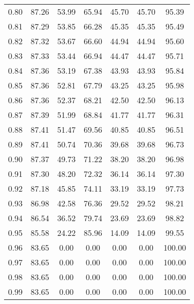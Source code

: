 \begin{tabular}{|c|c|c|c|c|c|c|}
      0.80 &     87.26 &     53.99 &      65.94 &   45.70 &      45.70 &         95.39 \\
      0.81 &     87.29 &     53.85 &      66.28 &   45.35 &      45.35 &         95.49 \\
      0.82 &     87.32 &     53.67 &      66.60 &   44.94 &      44.94 &         95.60 \\
      0.83 &     87.33 &     53.44 &      66.94 &   44.47 &      44.47 &         95.71 \\
      0.84 &     87.36 &     53.19 &      67.38 &   43.93 &      43.93 &         95.84 \\
      0.85 &     87.36 &     52.81 &      67.79 &   43.25 &      43.25 &         95.98 \\
      0.86 &     87.36 &     52.37 &      68.21 &   42.50 &      42.50 &         96.13 \\
      0.87 &     87.39 &     51.99 &      68.84 &   41.77 &      41.77 &         96.31 \\
      0.88 &     87.41 &     51.47 &      69.56 &   40.85 &      40.85 &         96.51 \\
      0.89 &     87.41 &     50.74 &      70.36 &   39.68 &      39.68 &         96.73 \\
      0.90 &     87.37 &     49.73 &      71.22 &   38.20 &      38.20 &         96.98 \\
      0.91 &     87.30 &     48.20 &      72.32 &   36.14 &      36.14 &         97.30 \\
      0.92 &     87.18 &     45.85 &      74.11 &   33.19 &      33.19 &         97.73 \\
      0.93 &     86.98 &     42.58 &      76.36 &   29.52 &      29.52 &         98.21 \\
      0.94 &     86.54 &     36.52 &      79.74 &   23.69 &      23.69 &         98.82 \\
      0.95 &     85.58 &     24.22 &      85.96 &   14.09 &      14.09 &         99.55 \\
      0.96 &     83.65 &      0.00 &       0.00 &    0.00 &       0.00 &        100.00 \\
      0.97 &     83.65 &      0.00 &       0.00 &    0.00 &       0.00 &        100.00 \\
      0.98 &     83.65 &      0.00 &       0.00 &    0.00 &       0.00 &        100.00 \\
      0.99 &     83.65 &      0.00 &       0.00 &    0.00 &       0.00 &        100.00 \\
\bottomrule
\end{tabular}
